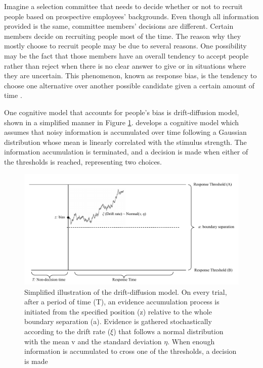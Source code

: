 Imagine a selection committee that needs to decide whether or not to recruit people based on prospective employees' backgrounds. Even though all information provided is the same, committee members' decisions are different. Certain members decide on recruiting people most of the time. The reason why they mostly choose to recruit people may be due to several reasons. One possibility may be the fact that those members have an overall tendency to accept people rather than reject when there is no clear answer to give or in situations where they are uncertain. This phenomenon, known as response bias, is the tendency to choose one alternative over another possible candidate given a certain amount of time \citep{GreenSwets1966, MacmillanCreelman2005}. 

One cognitive model that accounts for people's bias is \cites{Ratcliff1978} drift-diffusion model, shown in a simplified manner in Figure \ref{fig:diffusionmodel}. \citeauthor{Ratcliff1978} develops a cognitive model which assumes that noisy information is accumulated over time following a Gaussian distribution whose mean is linearly correlated with the stimulus strength. The information accumulation is terminated, and a decision is made when either of the thresholds is reached, representing two choices.

\begin{figure}[hbt!]
  \centering
  \includegraphics[width=\textwidth]{figure/ddm_model_grey.pdf}
  \caption{Simplified illustration of the drift-diffusion model. On every trial, after a period of time (T), an evidence accumulation process is initiated from the specified position (z) relative to the whole boundary separation (a). Evidence is gathered stochastically according to the drift rate ($\xi$) that follows a normal distribution with the mean v and the standard deviation $\eta$. When enough information is accumulated to cross one of the thresholds, a decision is made}
  \label{fig:diffusionmodel}
\end{figure}

